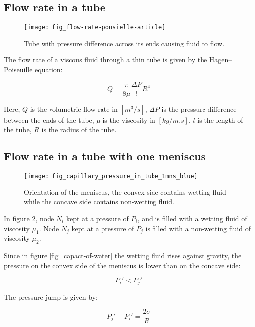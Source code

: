 \subsection{Flow rate in a tube}
	\begin{figure}[H]
		\centering
		\texttt{[image: fig\_flow-rate-pousielle-article]}
		\caption{Tube with pressure difference across its ends causing fluid to flow.}
		\label{fig_shape-meniscus}
	\end{figure}
	The flow rate of a viscous fluid through a thin tube is given by the Hagen–Poiseuille equation:
	
	\begin{equation} \label{eq:flow-rate}
		Q = \frac{\pi}{8\mu} \frac{\Delta P}{l} R^4
	\end{equation}
	
	Here, $Q$ is the volumetric flow rate in $[m^3/s]$, $\Delta P$ is the pressure difference between the ends of the tube, $\mu$ is the viscosity in $[kg/m.s]$, $l$ is the length of the tube, $R$ is the radius of the tube.
	
\subsection{Flow rate in a tube with one meniscus}
	\begin{figure}[H]
		\centering
		\texttt{[image: fig\_capillary\_pressure\_in\_tube\_1mns\_blue]}
		\caption{Orientation of the meniscus, the convex side contains wetting fluid while the concave side contains non-wetting fluid.}
		\label{fig_capillary_pressure_in_tube_1mns_blue}
	\end{figure}
	
	In figure \ref{fig_capillary_pressure_in_tube_1mns_blue}, node $N_{i}$ kept at a pressure of $P_{i}$, and is filled with a wetting fluid of viscosity $\mu_{1}$. Node $N_{j}$ kept at a pressure of $P_{j}$ is filled with a non-wetting fluid of viscosity $\mu_{2}$.
	
	Since in figure \ref{fig_capact-of-water} the wetting fluid rises against gravity, the pressure on the convex side of the meniscus is lower than on the concave side:
	
	\begin{equation}
		P_{i}' < P_{j}'
	\end{equation}
	
	The pressure jump is given by:
	
	\begin{equation} \label{eq:capillary_pressure_mns}
		P_{j}' - P_{i}' = \frac{2 \sigma}{R}
	\end{equation}
	
